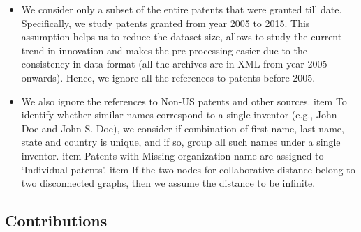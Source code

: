 	\begin{itemize}
		\item We consider only a subset of the entire patents that were granted till
		date. Specifically, we study patents granted from year 2005 to 2015. This
		assumption helps us to reduce the dataset size, allows to study the current
		trend in innovation and makes the pre-processing easier due to the
		consistency in data format (all the archives are in XML from year 2005
		onwards). Hence, we ignore all the references to patents before 2005.

		\item We also ignore the references to Non-US patents and other sources. item
		To identify whether similar names correspond to a single inventor (e.g., John
		Doe and John S. Doe), we consider if combination of first name, last name,
		state and country is unique, and if so, group all such names under a single
		inventor.  item Patents with Missing organization name  are assigned to
		`Individual patents'. item If the two nodes for collaborative distance belong
		to two disconnected graphs, then we assume the distance to be infinite.
	\end{itemize}


\subsection{Contributions}
